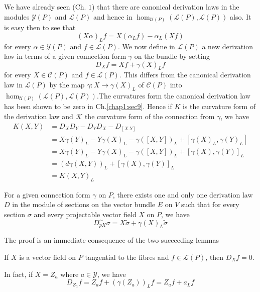 We have already seen (Ch. $1$) that there are canonical derivation
laws in the modules $\mathscr{Y}(P)$ and $\mathscr{L} (P)$ and hence
in $\hom_{\mathscr{U}(P)} (\mathscr{L}(P) , \mathscr{L}(P))$ also. It
is easy then to see that 
$$
(X \alpha)_L f = X(\alpha_L f) - \alpha_L (X f)
$$
for every $\alpha \in \mathscr{Y} (P)$ and $f \in \mathscr{L} (P)$. We
now define in $\mathscr{L}(P)$ a new derivation law in terms of a
given connection form $\gamma$ on the bundle by setting 
$$
D_X f = X f + \gamma (X)_L f 
$$ 
for every $X \in \mathscr{C}(P)$ and $f \in \mathscr{L}(P)$. This
differs from the canonical derivation law in $\mathscr{L}(P)$ by the
map $\gamma : X \to \gamma (X)_L$ of $\mathscr{C}(P)$ into
$\hom_{\mathscr{U}(P)} (\mathscr{L}(P), \mathscr{L} (P))$.\pageoriginale The
curvatures form the canonical derivation law has been shown to be zero
in Ch.\ref{chap1:sec9}. Hence if $K$ is the curvature form of the derivation law
and $\mathcal{K}$ the curvature form of the connection from $\gamma$, we
have 
\begin{align*}
  K(X,Y) & = D_X D_Y - D_Y D_X - D_{[X.Y]}\\
  & = X \gamma (Y)_L - Y \gamma (X)_L - \gamma ([X, Y])_L + [\gamma
    (X)_L , \gamma (Y)_L]\\ 
  & = X \gamma (Y)_L - Y \gamma (X)_L - \gamma ([X, Y])_L + [\gamma (X)
    , \gamma (Y)]_L\\ 
  & = (d \gamma (X, Y))_L + [\gamma (X), \gamma (Y)]_L\\
  & = K(X, Y)_L
\end{align*}

\begin{theorem}\label{chap5:sec6:thm3}%
  For a given connection form $\gamma$ on $P$, there exists one and
  only one derivation law $D$ in the module of sections on the vector
  bundle $E$ on $V$ such that for every section $\sigma$ and every
  projectable vector field $X$ on $P$, we have  
  $$
  D^{\sim}_{pX} \sigma = X \tilde{\sigma} + \gamma (X)_L \tilde{\sigma}
  $$
\end{theorem}

The proof is an immediate consequence of the two succeeding lemmas

\setcounter{lem}{0}
\begin{lem}\label{chap5:sec6:lem1} %
  If $X$ is a vector field on $P$ tangential to the fibres and $f
  \in \mathscr{L} (P)$, then $D_X f = 0$. 
\end{lem}

In fact, if $X = Z_a$ where $a \in \mathscr{Y}$, we have
$$
D_{Z_a} f = Z_a f + (\gamma(Z_a))_L f = Z_a f + a_L f
$$

